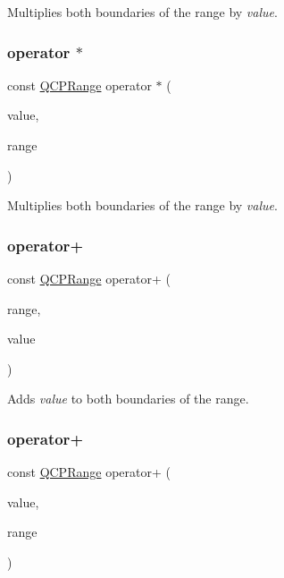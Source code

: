 Multiplies both boundaries of the range by {\itshape value}. \mbox{\label{class_q_c_p_range_a1bbd40705b837cf87032e1a4380e036a}} 
\subsubsection{\texorpdfstring{operator $\ast$}{operator *}\hspace{0.1cm}{\footnotesize\ttfamily [2/2]}}
{\footnotesize\ttfamily const \mbox{\hyperlink{class_q_c_p_range}{Q\+C\+P\+Range}} operator $\ast$ (\begin{DoxyParamCaption}\item[{double}]{value,  }\item[{const \mbox{\hyperlink{class_q_c_p_range}{Q\+C\+P\+Range}} \&}]{range }\end{DoxyParamCaption})\hspace{0.3cm}{\ttfamily [friend]}}

Multiplies both boundaries of the range by {\itshape value}. \mbox{\label{class_q_c_p_range_af53ea6fb823a4a5897162b865841de04}} 
\subsubsection{\texorpdfstring{operator+}{operator+}\hspace{0.1cm}{\footnotesize\ttfamily [1/2]}}
{\footnotesize\ttfamily const \mbox{\hyperlink{class_q_c_p_range}{Q\+C\+P\+Range}} operator+ (\begin{DoxyParamCaption}\item[{const \mbox{\hyperlink{class_q_c_p_range}{Q\+C\+P\+Range}} \&}]{range,  }\item[{double}]{value }\end{DoxyParamCaption})\hspace{0.3cm}{\ttfamily [friend]}}

Adds {\itshape value} to both boundaries of the range. \mbox{\label{class_q_c_p_range_a9fb2e9941d32001482df670c0d704977}} 
\subsubsection{\texorpdfstring{operator+}{operator+}\hspace{0.1cm}{\footnotesize\ttfamily [2/2]}}
{\footnotesize\ttfamily const \mbox{\hyperlink{class_q_c_p_range}{Q\+C\+P\+Range}} operator+ (\begin{DoxyParamCaption}\item[{double}]{value,  }\item[{const \mbox{\hyperlink{class_q_c_p_range}{Q\+C\+P\+Range}} \&}]{range }\end{DoxyParamCaption})\hspace{0.3cm}{\ttfamily [friend]}}

